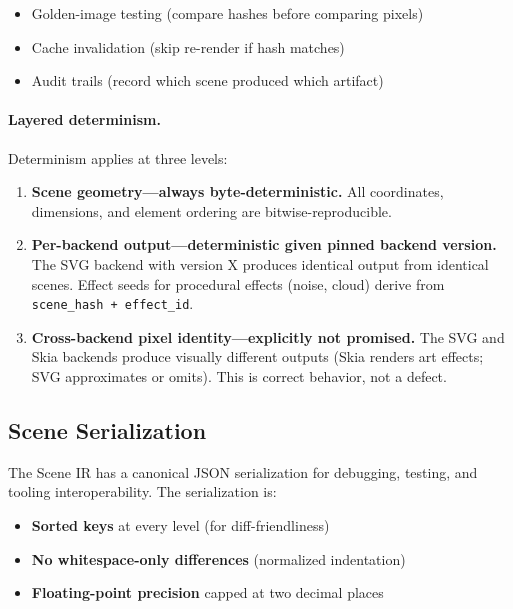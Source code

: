 \begin{itemize}
  \item Golden-image testing (compare hashes before comparing pixels)
  \item Cache invalidation (skip re-render if hash matches)
  \item Audit trails (record which scene produced which artifact)
\end{itemize}

\paragraph{Layered determinism.}
Determinism applies at three levels:

\begin{enumerate}
  \item \textbf{Scene geometry---always byte-deterministic.} All coordinates, dimensions, and element ordering are bitwise-reproducible.
  
  \item \textbf{Per-backend output---deterministic given pinned backend version.} The SVG backend with version X produces identical output from identical scenes. Effect seeds for procedural effects (noise, cloud) derive from \texttt{scene\_hash + effect\_id}.
  
  \item \textbf{Cross-backend pixel identity---explicitly not promised.} The SVG and Skia backends produce visually different outputs (Skia renders art effects; SVG approximates or omits). This is correct behavior, not a defect.
\end{enumerate}

\subsection{Scene Serialization}

The Scene IR has a canonical JSON serialization for debugging, testing, and tooling interoperability. The serialization is:

\begin{itemize}
  \item \textbf{Sorted keys} at every level (for diff-friendliness)
  \item \textbf{No whitespace-only differences} (normalized indentation)
  \item \textbf{Floating-point precision} capped at two decimal places
\end{itemize}

